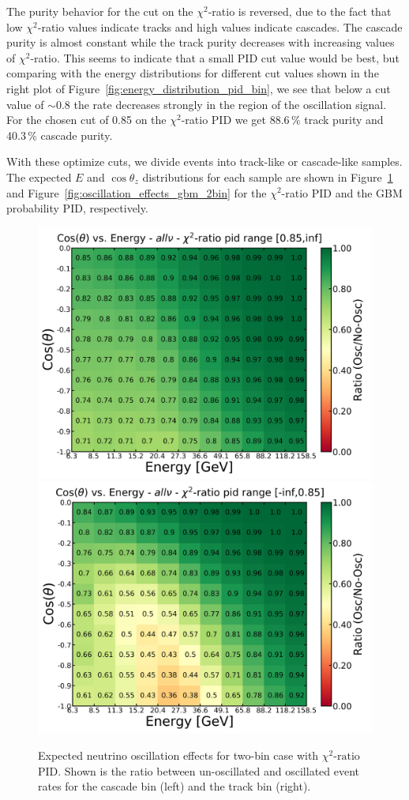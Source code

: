 The purity behavior for the cut on the $\chi^2$-ratio is reversed, due to the fact that low $\chi^2$-ratio values indicate tracks and high values indicate cascades.
The cascade purity is almost constant while the track purity decreases with increasing values of $\chi^2$-ratio.
This seems to indicate that a small PID cut value would be best, but comparing with the energy distributions for different cut values shown in the right plot of Figure~\ref{fig:energy_distribution_pid_bin}, we see that below a cut value of $\sim$0.8 the rate decreases strongly in the region of the oscillation signal.
For the chosen cut of 0.85 on the $\chi^2$-ratio PID we get 88.6\,\% track purity and 40.3\,\% cascade purity.

With these optimize cuts, we divide events into track-like or cascade-like samples.
The expected $E$ and $\cos\theta_z$ distributions for each sample are shown in Figure~\ref{fig:oscillation_effects_santa_2bin} and Figure~\ref{fig:oscillation_effects_gbm_2bin} for the $\chi^2$-ratio PID and the GBM probability PID, respectively.
\begin{figure}[h]
    \centering
    \includegraphics[width=0.49\linewidth]{figures/santa_cut_085_allnu_1_ratio_osc_noosc.png}
    \includegraphics[width=0.49\linewidth]{figures/santa_cut_085_allnu_0_ratio_osc_noosc.png}
    \caption[Expected neutrino oscillation effects for two-bin case with $\chi^2\textrm{-ratio}$ PID]{Expected neutrino oscillation effects for two-bin case with $\chi^2\textrm{-ratio}$ PID. Shown is the ratio between un-oscillated and oscillated event rates for the cascade bin (left) and the track bin (right).}
    \label{fig:oscillation_effects_santa_2bin}
\end{figure}
